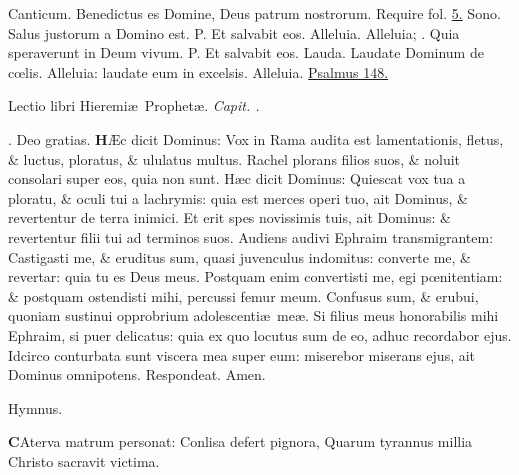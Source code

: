 \documentclass[letter,11pt]{book}
\makeatletter
\DeclareRobustCommand{\Vbar}{\vers@resp{-0.1em}{V}}
\DeclareRobustCommand{\Rbar}{\vers@resp{0pt}{R}}
\newcommand{\vers@resp@sym}{\raisebox{0.2ex}{\rotatebox[origin=c]{-20}{$\m@th\rceil$}}}
\newcommand{\vers@resp}[2]{%
  {\ooalign{\hidewidth\kern#1\vers@resp@sym\hidewidth\cr#2\cr}}%
}%
\def\P{\color{Red} P. \color{black}}
\def\V{\color{Red} \Vbar . \color{black}}
\def\R{\color{Red} \Rbar . \color{black}}
\makeatother
\begin{document}
\begin{multicols*}{2}
\newline \color{Red} Canticum. \color{black} Benedictus es Domine, Deus patrum nostrorum. \color{Red} Require fol. \color{black} \hyperlink{benedictus}{5.}
\newline \color{Red} Sono. \color{black} Salus justorum a Domino est. \P Et salvabit eos. Alleluia. Alleluia; \V Quia speraverunt in Deum vivum. \P Et salvabit eos.
\newline \color{Red} Lauda. \color{black} Laudate Dominum de c\oe lis. Alleluia: laudate eum in excelsis. Alleluia. \color{Red} \hyperlink{ps148}{Psalmus 148.} \color{black}
\vspace{-.5em} \begin{center} {\color{Red} L}ectio libri Hieremi\ae \ Prophet\ae . \itshape Capit. . \color{black} \end{center} \vspace{-.5em}
\par \noindent \R Deo gratias.
\lettrine[lines=2]{\bfseries \color{Red} H}{}\AE c dicit Dominus: Vox in Rama audita est lamentationis, fletus, \& luctus, ploratus, \& ululatus multus. Rachel plorans filios suos, \& noluit consolari super eos, quia non sunt. H\ae c dicit Dominus: Quiescat vox tua a ploratu, \& oculi tui a lachrymis: quia est merces operi tuo, ait Dominus, \& revertentur de terra inimici. Et erit spes novissimis tuis, ait Dominus: \& revertentur filii tui ad terminos suos. Audiens audivi Ephraim transmigrantem: Castigasti me, \& eruditus sum, quasi juvenculus indomitus: converte me, \& revertar: quia tu es Deus meus. Postquam enim convertisti me, egi p\oe nitentiam: \& postquam ostendisti mihi, percussi femur meum. Confusus sum, \& erubui, quoniam sustinui opprobrium adolescenti\ae \ me\ae . Si filius meus honorabilis mihi Ephraim, si puer delicatus: quia ex quo locutus sum de eo, adhuc recordabor ejus.
Idcirco conturbata sunt viscera mea super eum: miserebor miserans ejus, ait Dominus omnipotens. \color{Red} Respondeat. \color{black} Amen.
\vspace{-.5em} \begin{center} \color{Red} Hymnus. \color{black} \end{center} \vspace{-.5em}
\lettrine[lines=2]{\bfseries \color{Red} C}{}Aterva matrum personat:
\newline Conlisa defert pignora,
\newline \indent Quarum tyrannus millia
\newline \indent Christo sacravit victima.

\end{multicols*}
\end{document}
